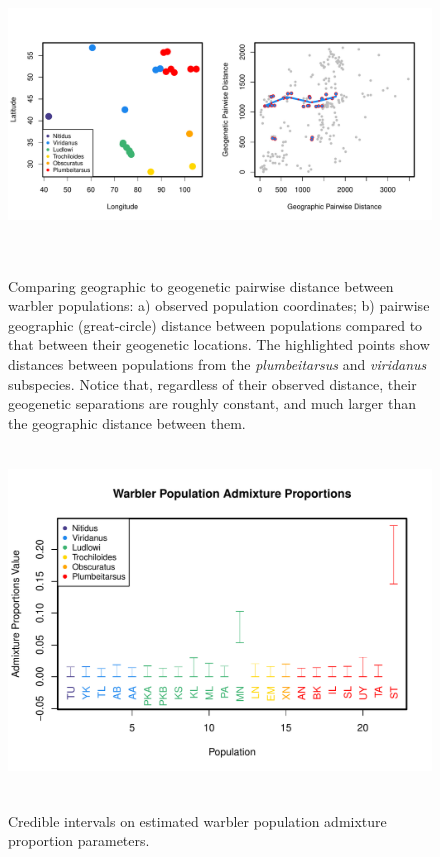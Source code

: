 \documentclass[10pt,letterpaper]{article}
\begin{document}
\begin{figure}
\centering
	{\includegraphics[width=6in,height=3in]{../figs/warblers/warb_pop_dist_compare.pdf}}
	\caption{
    Comparing geographic to geogenetic pairwise distance between warbler populations: a) observed population coordinates; b) pairwise geographic (great-circle) distance between populations compared to that between their geogenetic locations.  The highlighted points show distances between populations from the \textit{plumbeitarsus} and \textit{viridanus} subspecies.  Notice that, regardless of their observed distance, their geogenetic separations are roughly constant, and much larger than the geographic distance between them.
    }
	\label{sfig:warb_pop_distcomp}
\end{figure}

\begin{figure}
\centering
	{\includegraphics[width=5in,height=3.6in]{../figs/warblers/warb_pop_adprop.pdf}}
	\caption{Credible intervals on estimated warbler population admixture proportion parameters.}\label{sfig:warb_pop_adprop}
\end{figure}
\end{document}
